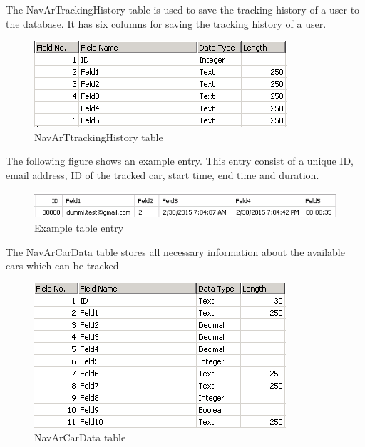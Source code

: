 The NavArTrackingHistory table is used to save the tracking history of a user to the database. It has six columns for saving the tracking history of a user.
\begin{figure}[htbp]
\centering
\includegraphics[width=\textwidth,height=\textheight,keepaspectratio]{graphics/trackingtable.png}
\caption{NavArTtrackingHistory table}
\end{figure}
\newline
  The following figure shows an example entry. This entry consist of a unique ID, email address, ID of the tracked car, start time, end time and duration.  
\begin{figure}[htbp]
\centering
\includegraphics[width=\textwidth,height=\textheight,keepaspectratio]{graphics/trackingtableexample.png}
\caption{Example table entry}
\end{figure}
\newpage
The NavArCarData table stores all necessary information about the available cars which can be tracked
\begin{figure}[htbp]
\centering
\includegraphics[width=\textwidth,height=\textheight,keepaspectratio]{graphics/cardatatable.png}
\caption{NavArCarData table}
\end{figure}

